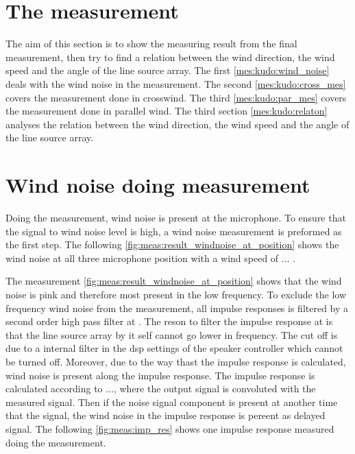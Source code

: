 \section{The measurement}
The aim of this section is to show the measuring result from the final measurement, then try to find a relation between the wind direction, the wind speed and the angle of the line source array. The first \autoref{mes:kudo:wind_noise} deals with the wind noise in the measurement. The second  \autoref{mes:kudo:cross_mes} covers the measurement done in crosswind. The third  \autoref{mes:kudo:par_mes} covers the measurement done in parallel wind. The third section \autoref{mes:kudo:relaton} analyses the relation between the wind direction, the wind speed and the angle of the line source array.


\section{Wind noise doing measurement}\label{mes:kudo:wind_noise}
Doing the measurement, wind noise is present at the microphone. To ensure that the signal to wind noise level is high, a wind noise measurement is preformed as the first step. The following \autoref{fig:meas:result_windnoise_at_position} shows the wind noise at all three microphone position with a wind speed of ... . 




The measurement \autoref{fig:meas:result_windnoise_at_position} shows that the wind noise is pink and therefore most present in the low frequency. To exclude the low frequency wind noise from the measurement, all impulse responses is filtered by a second order high pass filter at . The reson to filter the impulse response at  is that the line source array by it self cannot go lower in frequency. The cut off is due to a internal filter in the \gls{dsp} settings of the speaker controller which cannot be turned off. Moreover, due to the way thast the impulse response is calculated, wind noise is present along the impulse response. The impulse response is calculated according to ..., where the output signal is convoluted with the measured signal. Then if the noise signal component is present at another time that the signal, the wind noise in the impulse response is pereent as delayed signal. The following \autoref{fig:meas:imp_res} shows one impulse response measured doing the measurement.

